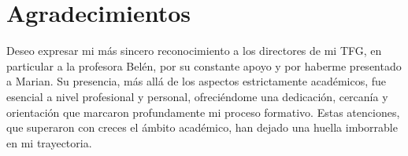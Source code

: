 
\chapter*{Agradecimientos}

Deseo expresar mi más sincero reconocimiento a los directores de mi TFG, en particular a la profesora Belén, por su constante apoyo y por haberme presentado a Marian. Su presencia, más allá de los aspectos estrictamente académicos, fue esencial a nivel profesional y personal, ofreciéndome una dedicación, cercanía y orientación que marcaron profundamente mi proceso formativo. Estas atenciones, que superaron con creces el ámbito académico, han dejado una huella imborrable en mi trayectoria.




